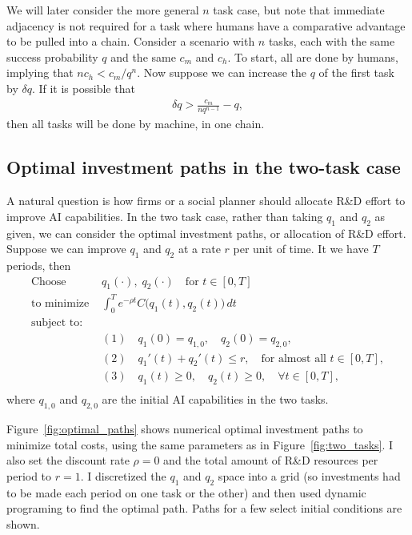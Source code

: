 \documentclass{article}
\begin{document}
We will later consider the more general $n$ task case, but note that immediate adjacency is not required for a task where humans have a comparative advantage to be pulled into a chain.
Consider a scenario with $n$ tasks, each with the same success probability $q$ and the same $c_m$ and $c_h$.
To start, all are done by humans, implying that $n c_h < c_m / q^n$.
Now suppose we can increase the $q$ of the first task by $\delta q$. 
If it is possible that  
\begin{align}
  \delta q > \frac{c_m}{n q^{n-1}} - q,
\end{align} 
then all tasks will be done by machine, in one chain.

\subsection{Optimal investment paths in the two-task case}
A natural question is how firms or a social planner should allocate R\&D effort to improve AI capabilities.
In the two task case, rather than taking $q_1$ and $q_2$ as given, we can consider the optimal investment paths, or allocation of R\&D effort.
Suppose we can improve $q_1$ and $q_2$ at a rate $r$ per unit of time.
It we have $T$ periods, then 
\[
\begin{aligned}
\text{Choose } &q_1(\cdot), \; q_2(\cdot) \quad \text{for } t \in [0, T]\\
\text{to minimize } &
   \int_{0}^{T}
   e^{-\rho t} C\bigl(q_1(t), q_2(t)\bigr) \, dt \\[1em]
\text{subject to:} & \\[-1em]
&(1)\quad q_1(0) = q_{1,0}, \quad q_2(0) = q_{2,0}, \\[6pt]
&(2)\quad q_1'(t) + q_2'(t) \le r, \quad \text{for almost all } t \in [0, T], \\[6pt]
&(3)\quad q_1(t) \geq 0, \quad q_2(t) \geq 0, \quad \forall t \in [0, T], \\[6pt]
\end{aligned}
\]
where $q_{1,0}$ and $q_{2,0}$ are the initial AI capabilities in the two tasks.

Figure~\ref{fig:optimal_paths} shows numerical optimal investment paths to minimize total costs, using the same parameters as in Figure~\ref{fig:two_tasks}.
I also set the discount rate $\rho = 0$ and the total amount of R\&D resources per period  to $r = 1$.
I discretized the $q_1$ and $q_2$ space into a grid (so investments had to be made each period on one task or the other) and then used dynamic programing to find the optimal path.
Paths for a few select initial conditions are shown.
\end{document}
